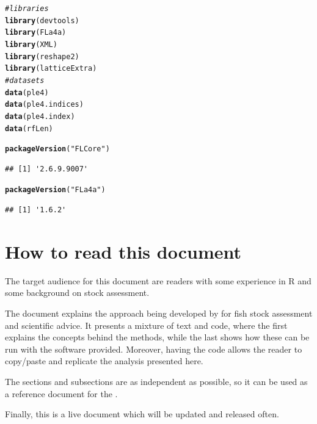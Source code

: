 \documentclass[a4paper,english,10pt]{article}\usepackage[]{graphicx}\usepackage[]{color}
\makeatletter
\newcommand{\hlstr}[1]{\textcolor[rgb]{0.192,0.494,0.8}{#1}}%
\newcommand{\hlcom}[1]{\textcolor[rgb]{0.678,0.584,0.686}{\textit{#1}}}%
\newcommand{\hlstd}[1]{\textcolor[rgb]{0.345,0.345,0.345}{#1}}%
\newcommand{\hlkwd}[1]{\textcolor[rgb]{0.737,0.353,0.396}{\textbf{#1}}}%
\newenvironment{kframe}{%
 \def\at@end@of@kframe{}%
 \ifinner\ifhmode%
  \def\at@end@of@kframe{\end{minipage}}%
  \begin{minipage}{\columnwidth}%
 \fi\fi%
 \def\FrameCommand##1{\hskip\@totalleftmargin \hskip-\fboxsep
 \colorbox{shadecolor}{##1}\hskip-\fboxsep
     \hskip-\linewidth \hskip-\@totalleftmargin \hskip\columnwidth}%
 \MakeFramed {\advance\hsize-\width
   \@totalleftmargin\z@ \linewidth\hsize
   \@setminipage}}%
 {\par\unskip\endMakeFramed%
 \at@end@of@kframe}
\newenvironment{knitrout}{}{} %
\makeatother
\begin{document}
\begin{knitrout}
\color{fgcolor}\begin{kframe}
\begin{alltt}
\hlcom{# libraries}
\hlkwd{library}\hlstd{(devtools)}
\hlkwd{library}\hlstd{(FLa4a)}
\hlkwd{library}\hlstd{(XML)}
\hlkwd{library}\hlstd{(reshape2)}
\hlkwd{library}\hlstd{(latticeExtra)}
\hlcom{# datasets}
\hlkwd{data}\hlstd{(ple4)}
\hlkwd{data}\hlstd{(ple4.indices)}
\hlkwd{data}\hlstd{(ple4.index)}
\hlkwd{data}\hlstd{(rfLen)}
\end{alltt}
\end{kframe}
\end{knitrout}

\begin{knitrout}
\color{fgcolor}\begin{kframe}
\begin{alltt}
\hlkwd{packageVersion}\hlstd{(}\hlstr{"FLCore"}\hlstd{)}
\end{alltt}
\begin{verbatim}
## [1] '2.6.9.9007'
\end{verbatim}
\begin{alltt}
\hlkwd{packageVersion}\hlstd{(}\hlstr{"FLa4a"}\hlstd{)}
\end{alltt}
\begin{verbatim}
## [1] '1.6.2'
\end{verbatim}
\end{kframe}
\end{knitrout}



\section{How to read this document}

The target audience for this document are readers with some experience in R and some background on stock assessment.

The document explains the approach being developed by \aFa for fish stock assessment and scientific advice. It presents a mixture of text and code, where the first explains the concepts behind the methods, while the last shows how these can be run with the software provided. Moreover, having the code allows the reader to copy/paste and replicate the analysis presented here.

The sections and subsections are as independent as possible, so it can be used as a reference document for the . 



Finally, this is a live document which will be updated and released often.
\end{document}
